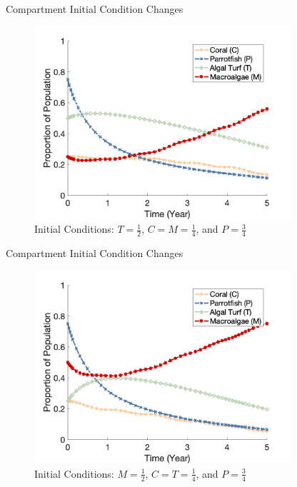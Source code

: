 \documentclass{beamer}
\begin{document}
\begin{frame}{Compartment Initial Condition Changes}
    \begin{figure}
        \centering
        \includegraphics[width=0.85\textwidth]{Latex/Figures/Graphs/0.25C_0.5T_0.25M.png}
        \caption{Initial Conditions: $T = \frac{1}{2}$, $C = M = \frac{1}{4}$, and $P = \frac{3}{4}$}
        \label{fig:turf_dominant}
    \end{figure}
\end{frame}

\begin{frame}{Compartment Initial Condition Changes}
    \begin{figure}
        \centering
        \includegraphics[width=0.85\textwidth]{Latex/Figures/Graphs/0.25C_0.25T_0.5M.png}
        \caption{Initial Conditions: $M = \frac{1}{2}$, $C = T = \frac{1}{4}$, and $P = \frac{3}{4}$}
        \label{fig:macroalgae_dominant}
    \end{figure}
\end{frame}
\end{document}
